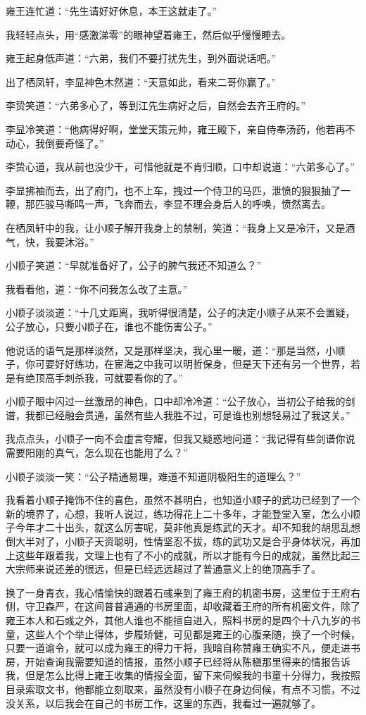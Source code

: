 雍王连忙道：“先生请好好休息，本王这就走了。”

我轻轻点头，用“感激涕零”的眼神望着雍王，然后似乎慢慢睡去。

雍王起身低声道：“六弟，我们不要打扰先生，到外面说话吧。”

出了栖凤轩，李显神色木然道：“天意如此，看来二哥你赢了。”

李贽笑道：“六弟多心了，等到江先生病好之后，自然会去齐王府的。”

李显冷笑道：“他病得好啊，堂堂天策元帅，雍王殿下，亲自侍奉汤药，他若再不动心，我倒要奇怪了。”

李贽心道，我从前也没少干，可惜他就是不肯归顺，口中却说道：“六弟多心了。”

李显拂袖而去，出了府门，也不上车，拽过一个侍卫的马匹，泄愤的狠狠抽了一鞭，那匹骏马嘶鸣一声，飞奔而去，李显不理会身后人的呼唤，愤然离去。

在栖凤轩中的我，让小顺子解开我身上的禁制，笑道：“我身上又是冷汗，又是酒气，快，我要沐浴。”

小顺子笑道：“早就准备好了，公子的脾气我还不知道么？”

我看看他，道：“你不问我怎么改了主意。”

小顺子淡淡道：“十几丈距离，我听得很清楚，公子的决定小顺子从来不会置疑，公子放心，只要小顺子在，谁也不能伤害公子。”

他说话的语气是那样淡然，又是那样坚决，我心里一暖，道：“那是当然，小顺子，你可要好好练功，在宦海之中我可以明哲保身，但是天下还有另一个世界，若是有绝顶高手刺杀我，可就要看你的了。”

小顺子眼中闪过一丝激昂的神色，口中却冷冷道：“公子放心，当初公子给我的剑谱，我都已经融会贯通，虽然有些人我胜不过，可是谁也别想轻易过了我这关。”

我点点头，小顺子一向不会虚言夸耀，但我又疑惑地问道：“我记得有些剑谱你说需要阳刚的真气，怎么现在也能用了么？”

小顺子淡淡一笑：“公子精通易理，难道不知道阴极阳生的道理么？”

我看着小顺子掩饰不住的喜色，虽然不甚明白，也知道小顺子的武功已经到了一个新的境界了，心想，我听人说过，练功得花上二十多年，才能登堂入室，怎么小顺子今年才二十出头，就这么厉害呢，莫非他真是练武的天才。却不知我的胡思乱想倒大半对了，小顺子天资聪明，性情坚忍不拔，练的武功又是合乎身体状况，再加上这些年跟着我，文理上也有了不小的成就，所以才能有今日的成就，虽然比起三大宗师来说还差的很远，但是已经远远超过了普通意义上的绝顶高手了。

换了一身青衣，我心情愉快的跟着石彧来到了雍王府的机密书房，这里位于王府右侧，守卫森严，在这间普普通通的书房里面，却收藏着王府的所有机密文件，除了雍王本人和石彧之外，其他人谁也不能擅自进入，照料书房的是四个十八九岁的书童，这些人个个举止得体，步履矫健，可见都是雍王的心腹亲随，换了一个时候，只要一道谕令，就可以成为雍王的得力干将，我暗自称赞雍王确实不凡，便走进书房，开始查询我需要知道的情报，虽然小顺子已经将从陈稹那里得来的情报告诉我，但是怎么比得上雍王收集的情报全面，留下来伺候我的书童十分得力，我按照目录索取文书，他都能立刻取来，虽然没有小顺子在身边伺候，有点不习惯，不过没关系，以后我会在自己的书房工作，这里的东西，我看过一遍就够了。

